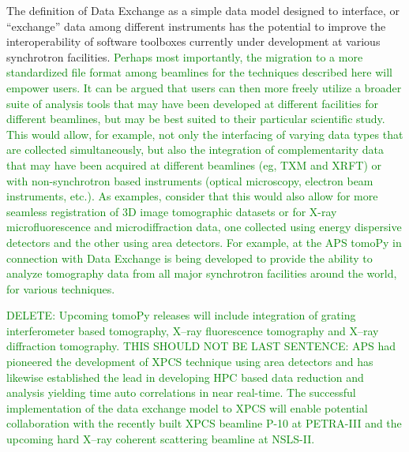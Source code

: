 \documentclass[pdf]{iucr}              %
\begin{document}
The definition of Data Exchange as a simple data model designed to interface, or ``exchange'' data among different instruments has the potential to improve the interoperability of software toolboxes currently under development at various synchrotron facilities. \textcolor{green}{Perhaps most importantly, the migration to a more standardized file format among beamlines for the techniques described here will empower users. It can be argued that users can then more freely utilize a broader suite of analysis tools that may have been developed at different facilities for different beamlines, but may be best suited to their particular scientific study. This would allow, for example, not only the interfacing of varying data types that are collected simultaneously, but also the integration of complementarity data that may have been acquired at different beamlines (eg, TXM and XRFT) or with non-synchrotron based instruments (optical microscopy, electron beam instruments, etc.). As examples, consider that this would also allow for more seamless registration of 3D image tomographic datasets or for X-ray microfluorescence and microdiffraction data, one collected using energy dispersive detectors and the other using area detectors. For example, at the APS tomoPy \cite{python_cpp} in connection with Data Exchange is being developed to provide the ability to analyze tomography data from all major synchrotron facilities around the world, for various techniques.} 
\item \textcolor{green}{DELETE: Upcoming tomoPy releases will include integration of grating interferometer based tomography, X--ray fluorescence tomography and X--ray diffraction tomography.}
\textcolor{green}{THIS SHOULD NOT BE LAST SENTENCE: APS had pioneered the development of XPCS technique using area detectors and has likewise established the lead in developing HPC based data reduction and analysis yielding time auto correlations in near real-time. The successful implementation of the data exchange model to XPCS will enable potential collaboration with the recently built XPCS beamline P-10 at PETRA-III and the upcoming hard X--ray coherent scattering beamline at NSLS-II. }



\end{document}
